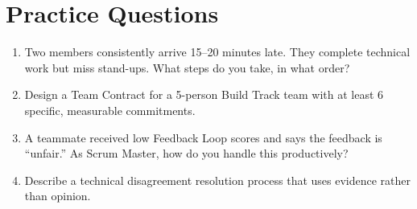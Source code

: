 \section{Practice Questions}
\begin{enumerate}[leftmargin=1.5em]
\item Two members consistently arrive 15--20 minutes late. They complete technical work but miss stand-ups. What steps do you take, in what order?
\item Design a Team Contract for a 5-person Build Track team with at least 6 specific, measurable commitments.
\item A teammate received low Feedback Loop scores and says the feedback is ``unfair.'' As Scrum Master, how do you handle this productively?
\item Describe a technical disagreement resolution process that uses evidence rather than opinion.
\end{enumerate}


